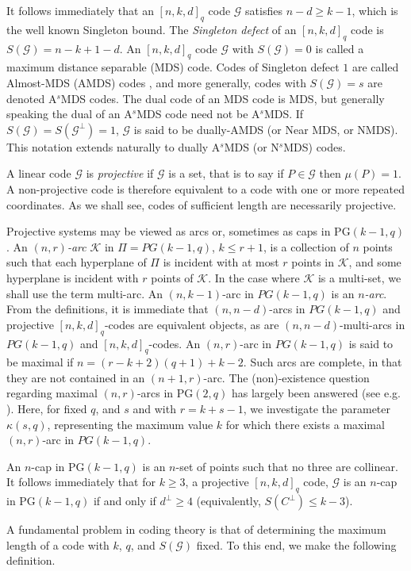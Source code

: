 \documentclass[11pt,a4paper]{amsart}
\newcommand{\K}{\mathcal{K}}
\newcommand{\G}{\mathcal{G}}
\theoremstyle{plain}
\theoremstyle{definition}
\theoremstyle{remark}
\begin{document}
	It follows immediately that  an $ [n,k,d ]_q$ code $\G$ satisfies $n-d\geq k-1$, which is the well known Singleton bound.  The \textit{Singleton defect} of an $[n,k,d]_q$ code is $S(\G)=n-k+1-d$.  An $ [n,k,d]_q$ code $\G$ with $S(\G)=0$ is called a maximum distance separable (MDS) code.  Codes of Singleton defect $1$ are called Almost-MDS (AMDS) codes \cite{MR1409442}, and more generally, codes with $S(\G) = s$ are denoted A$^s$MDS codes. The dual code of an MDS code is MDS, but generally speaking the dual of an A$^s$MDS code need not be A$^s$MDS.  If $S(\G)=S(\G^\perp)=1$, $\G$ is said to be dually-AMDS (or Near MDS, or NMDS). This notation extends naturally to dually A$^s$MDS (or N$^s$MDS) codes.

	A linear code  $\G$ is \textit{projective} if $\G$ is a set, that is to say if $P\in \G$ then $\mu(P)=1$. A non-projective code is therefore equivalent to a code with one or more repeated coordinates. As we shall see, codes of sufficient length are necessarily projective.

	Projective systems may be viewed as arcs or, sometimes as caps in PG$(k-1,q)$. An \textit{$(n,r)$-arc} $\K$ in $\Pi=PG(k-1,q)$, $k\leq r+1$, is a collection of  $n$ points such that each hyperplane of $\Pi$ is incident
	with at most $r$ points in $\K$, and some hyperplane is incident with $r$ points of $\K$. In the case where $\K$ is a multi-set, we shall use the term multi-arc. An $(n,k-1)$-arc in $PG(k-1,q)$ is an \textit{$n$-arc}.
	From the definitions, it is immediate that $(n,n-d)$-arcs in $PG(k-1,q)$ and  projective $[n,k,d]_q$-codes are equivalent objects, as are  $(n,n-d)$-multi-arcs in $PG(k-1,q)$ and $[n,k,d]_q$-codes. An $(n,r)$-arc in $PG(k-1,q)$ is said to be maximal if $n=(r-k+2)(q+1)+k-2$. Such arcs are complete, in that they are not contained in an $(n+1,r)$-arc. The (non)-existence question regarding maximal $(n,r)$-arcs in PG$(2,q)$ has largely been answered (see e.g.\cite{MR2158768} ). Here, for fixed $q$, and $s$ and with $r=k+s-1$, we  investigate the parameter $\kappa(s,q)$, representing the maximum value $k$ for which there exists a maximal $(n,r)$-arc in $PG(k-1,q)$.

	An $n$-cap in PG$(k-1,q)$ is an $n$-set of points such that no three are collinear. It follows immediately that for $k\ge 3$, a projective $[n,k,d]_q$ code, $\G$ is an $n$-cap in PG$(k-1,q)$ if and only if $d^\perp \ge 4$ (equivalently, $S(C^\perp)\le k-3$).

	A fundamental problem in coding theory is that of determining the maximum length of a code with $k$, $q$, and $S(\G)$ fixed. To this end, we make the following definition.
\end{document}
